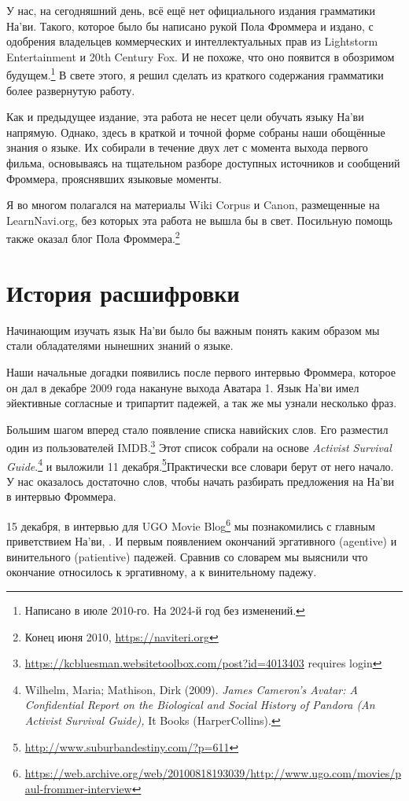 
У нас, на сегодняшний день, всё ещё нет официального издания грамматики На'ви. Та\-ко\-го, которое было бы написано рукой Пола Фроммера и издано, с одобрения владельцев
ком\-мер\-чес\-ких и интеллектуальных прав из Lightstorm Entertainment
и 20th Century Fox. И не похоже, что оно появится в обозримом
будущем.\footnote{Написано в июле 2010-го. На 2024-й год без изменений.} В свете этого, я решил сделать из краткого содержания
грамматики более развернутую работу.

Как и предыдущее издание, эта работа не несет цели обучать языку На'ви напрямую. Однако, здесь в краткой и точной форме собраны наши обощённые знания о языке.
Их собирали в течение двух лет с момента выхода первого фильма, основываясь на тща\-тель\-ном разборе доступных источников и сообщений Фроммера, прояснявших языковые моменты.

Я во многом полагался на материалы Wiki Corpus и Canon,
размещенные на LearnNavi.\-org,
без которых эта работа не вышла бы в свет. Посильную помощь также оказал блог Пола Фроммера.\footnote{Конец июня 2010,
\url{https://naviteri.org}}


\section{История расшифровки}
Начинающим изучать язык На'ви было бы важным понять каким образом мы стали обладателями нынешних знаний о языке.

Наши начальные догадки появились после первого интервью Фроммера, которое он дал в декабре 2009 года накануне выхода Аватара 1. Язык На'ви
имел эйективные соглас\-ные и трипартит падежей, а так же мы узнали несколько фраз.

Большим шагом вперед стало появление списка навийских слов. Его разместил один из пользователей IMDB.\footnote{\url{https://kcbluesman.websitetoolbox.com/post?id=4013403}
requires login} Этот список собрали на основе \textit{Activist
Survival Guide}.\footnote{Wilhelm, Maria; Mathison, Dirk (2009).
\textit{James
Cameron's Avatar: A Confidential Report on the Biological and
Social
History of Pandora (An Activist Survival Guide),} It Books
(HarperCollins).}
и вы\-ло\-жи\-ли 11
декабря.\footnote{\url{http://www.suburbandestiny.com/?p=611}}Практически
все словари берут от него начало. У нас оказалось достаточно
слов, чтобы начать разбирать предложения на На'ви в интервью
Фроммера.

15 декабря, в интервью для UGO Movie
Blog\footnote{\url{https://web.archive.org/web/20100818193039/http://www.ugo.com/movies/paul-frommer-interview}}
мы познакомились с главным привет\-стви\-ем На'ви,  . И первым появлением окончаний
эргативного (agenti\-ve) и винительного (patientive) падежей.
Сравнив со словарем мы выяснили что окончание  относилось к
эргативному, а  к винительному падежу.

